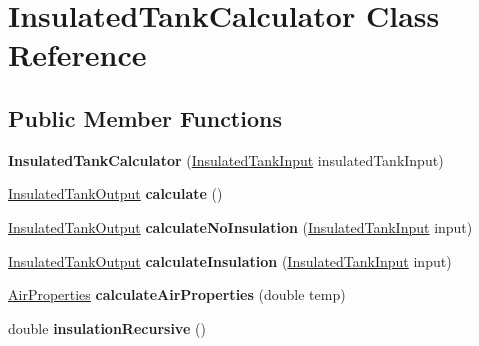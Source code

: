 \hypertarget{class_insulated_tank_calculator}{}\section{Insulated\+Tank\+Calculator Class Reference}
\label{class_insulated_tank_calculator}
\subsection*{Public Member Functions}
\begin{DoxyCompactItemize}
\item 
\mbox{\label{class_insulated_tank_calculator_a2179048bd97f926178964043c3249ae6}} 
{\bfseries Insulated\+Tank\+Calculator} (\hyperlink{class_insulated_tank_input}{Insulated\+Tank\+Input} insulated\+Tank\+Input)
\item 
\mbox{\label{class_insulated_tank_calculator_a028195292f18e48216475db52a0f4651}} 
\hyperlink{class_insulated_tank_output}{Insulated\+Tank\+Output} {\bfseries calculate} ()
\item 
\mbox{\label{class_insulated_tank_calculator_af1b61338df8facee94cdd2c88d160eee}} 
\hyperlink{class_insulated_tank_output}{Insulated\+Tank\+Output} {\bfseries calculate\+No\+Insulation} (\hyperlink{class_insulated_tank_input}{Insulated\+Tank\+Input} input)
\item 
\mbox{\label{class_insulated_tank_calculator_a9dede09f397b135d15451c06e20596a9}} 
\hyperlink{class_insulated_tank_output}{Insulated\+Tank\+Output} {\bfseries calculate\+Insulation} (\hyperlink{class_insulated_tank_input}{Insulated\+Tank\+Input} input)
\item 
\mbox{\label{class_insulated_tank_calculator_af65eb305cc12e7e1c539e160f60837bd}} 
\hyperlink{class_air_properties}{Air\+Properties} {\bfseries calculate\+Air\+Properties} (double temp)
\item 
\mbox{\label{class_insulated_tank_calculator_aa924a8b8a7e0d17e33666e910b8d6d0b}} 
double {\bfseries insulation\+Recursive} ()
\item 

\end{DoxyCompactItemize}
